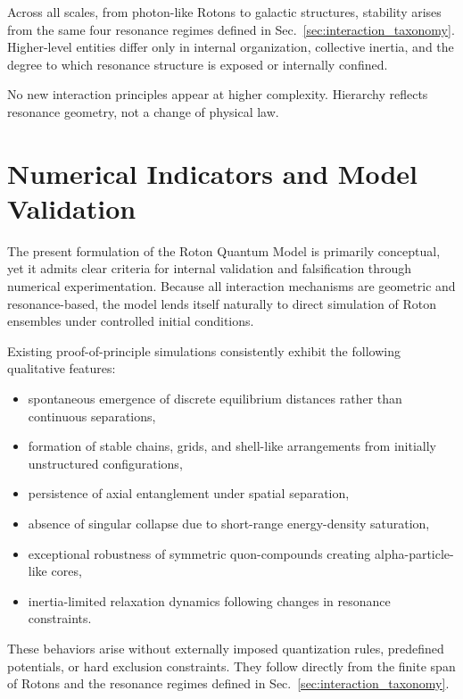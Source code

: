 \documentclass[11pt,a4paper]{article}
\begin{document}
Across all scales, from photon-like Rotons to galactic structures, stability arises from
the same four resonance regimes defined in Sec.~\ref{sec:interaction_taxonomy}.
Higher-level entities differ only in internal organization, collective inertia, and the
degree to which resonance structure is exposed or internally confined.

No new interaction principles appear at higher complexity.
Hierarchy reflects resonance geometry, not a change of physical law.



\section{Numerical Indicators and Model Validation}
\label{sec:validation}

The present formulation of the Roton Quantum Model is primarily conceptual, yet it admits
clear criteria for internal validation and falsification through numerical experimentation.
Because all interaction mechanisms are geometric and resonance-based, the model lends itself
naturally to direct simulation of Roton ensembles under controlled initial conditions.

Existing proof-of-principle simulations consistently exhibit the following qualitative
features:

\begin{itemize}
  \item spontaneous emergence of discrete equilibrium distances rather than continuous
        separations,
  \item formation of stable chains, grids, and shell-like arrangements from initially
        unstructured configurations,
  \item persistence of axial entanglement under spatial separation,
  \item absence of singular collapse due to short-range energy-density saturation,
  \item exceptional robustness of symmetric quon-compounds creating alpha-particle-like cores,
  \item inertia-limited relaxation dynamics following changes in resonance constraints.
\end{itemize}

These behaviors arise without externally imposed quantization rules, predefined potentials,
or hard exclusion constraints.
They follow directly from the finite span of Rotons and the resonance regimes defined in
Sec.~\ref{sec:interaction_taxonomy}.
\end{document}
